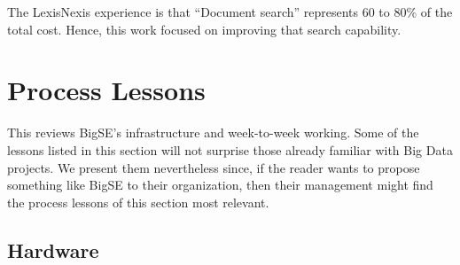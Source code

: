 \documentclass{sig-alternate-05-2015}
\theoremstyle{break}
\begin{document}

The LexisNexis experience is that
``Document search'' represents 60 to 80\% of the total  cost. Hence, this
work focused on improving that search capability. 
 
 


\section{Process Lessons}
This reviews BigSE's  infrastructure
and week-to-week working.  Some of the lessons listed in this section will not
surprise those already familiar with Big  Data projects. We present
them nevertheless since, if the
reader wants to propose something like BigSE to their organization, 
then  their management might find the process lessons of
this section
most relevant.


\subsection{Hardware}
\end{document}
